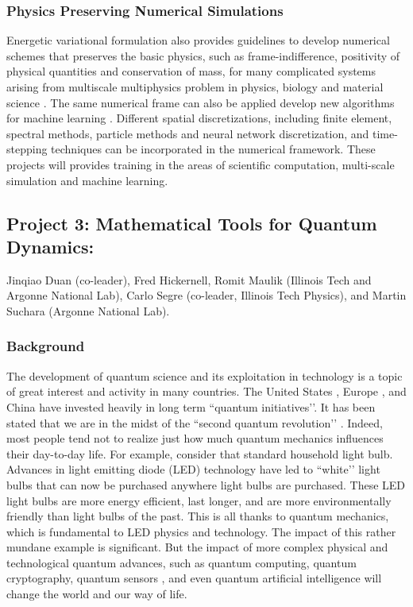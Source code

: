 \documentclass[11pt]{NSFamsart}
\begin{document}
\subsubsection*{Physics Preserving Numerical Simulations}
Energetic variational formulation also provides guidelines to develop numerical schemes that preserves the basic physics, such as frame-indifference, positivity of physical quantities  and conservation of mass, for many complicated systems arising from multiscale multiphysics problem in physics, biology and material science \cite{liu2020variational, liu2020lagrangian, liu2020structure}. The same numerical frame can also be applied develop new algorithms for machine learning \cite{wang2020particle}. Different spatial discretizations, including finite element, spectral methods, particle methods and neural network discretization, and time-stepping techniques can be incorporated in the numerical framework. These projects will provides training in the areas of scientific computation, multi-scale simulation and machine learning.



\subsection*{Project 3: Mathematical Tools for Quantum Dynamics:}
Jinqiao Duan (co-leader), Fred Hickernell, Romit Maulik (Illinois Tech and Argonne National Lab), Carlo Segre (co-leader, Illinois Tech Physics), and Martin Suchara (Argonne National Lab).

\subsubsection*{Background} The development of quantum science and its exploitation in technology is a topic of great interest and activity in many countries. The United States \cite{raymer2019us}, Europe \cite{riedel2019europe}, and China \cite{kania2018quantum} have invested heavily in long term ``quantum initiatives’’.  It has been stated that we are in the midst of the ``second quantum revolution’’ \cite{kania2018quantum}. Indeed,  most people tend not to realize just how much quantum mechanics influences their day-to-day life. For example, consider that standard household light bulb. Advances in light emitting diode (LED) technology have led to ``white’’ light bulbs that can now be purchased anywhere light bulbs are purchased. These LED light bulbs are more energy efficient, last longer, and are more environmentally friendly than light bulbs of the past. This is all thanks to quantum mechanics, which is fundamental to LED physics and technology. The impact of this rather mundane example is significant. But the impact of more complex physical and technological quantum advances, such as quantum computing, quantum cryptography, quantum sensors \cite{ng2020guest}, and even quantum artificial intelligence \cite{taylor2020quantum} will change the world and our way of life.
\end{document}
